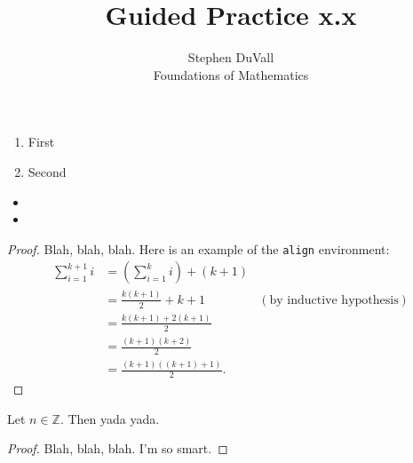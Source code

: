 \documentclass[12pt]{article}
\newcommand{\Z}{\mathbb{Z}}
\newenvironment{theorem}[2][Theorem]{\begin{trivlist}
\item[\hskip \labelsep {\bfseries #1}\hskip \labelsep {\bfseries #2.}]}{\end{trivlist}}
\newenvironment{prchk}[2][Progress Check]{\begin{trivlist}
\item[\hskip \labelsep {\bfseries #1}\hskip \labelsep {\bfseries #2.}]}{\end{trivlist}}
\newenvironment{bgact}[2][Beginning Activity]{\begin{trivlist}
\item[\hskip \labelsep {\bfseries #1}\hskip \labelsep {\bfseries #2.}]}{\end{trivlist}}
\newenvironment{exe}[2][Exercise]{\begin{trivlist}
\item[\hskip \labelsep {\bfseries #1}\hskip \labelsep {\bfseries #2.}]}{\end{trivlist}}
\begin{document}
\title{Guided Practice x.x}
\author{Stephen DuVall \\
Foundations of Mathematics}

\maketitle

\begin{bgact}{x.yz}
\hfill
\begin{enumerate}
\item First
\item Second
\end{enumerate}
\end{bgact}

\begin{prchk}{x.yz}
\hfill
\begin{itemize}
\item[(a)]
\item[(b)]
\end{itemize}
\end{prchk}

\begin{exe}{x.yz}
\hfill
\end{exe}

\begin{theorem}{x.yz}
\end{theorem}

\begin{proof}
Blah, blah, blah.  Here is an example of the \texttt{align} environment:
\begin{align*}
\sum_{i=1}^{k+1}i & = \left(\sum_{i=1}^{k}i\right) +(k+1)\\
& = \frac{k(k+1)}{2}+k+1 & (\text{by inductive hypothesis})\\
& = \frac{k(k+1)+2(k+1)}{2}\\
& = \frac{(k+1)(k+2)}{2}\\
& = \frac{(k+1)((k+1)+1)}{2}.
\end{align*}
\end{proof}

\begin{theorem}{x.yz}
Let $n\in \Z$.  Then yada yada.
\end{theorem}

\begin{proof}
Blah, blah, blah.  I'm so smart.
\end{proof}
\end{document}
